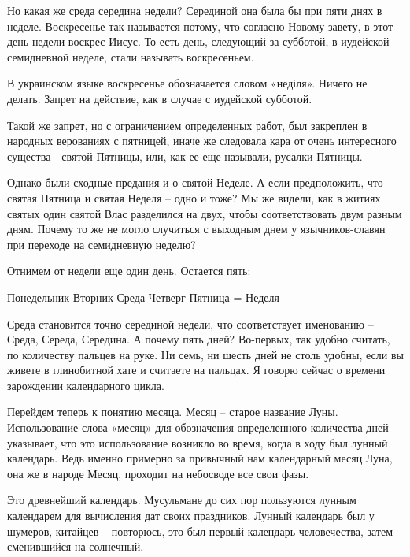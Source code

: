 \documentclass[a5paper,11pt,openany]{article}
\begin{document}
  Но какая же среда середина недели? Серединой она была бы при пяти днях в неделе. Воскресенье так называется потому, что согласно Новому завету, в этот день недели воскрес Иисус. То есть день, следующий за субботой, в иудейской семидневной неделе, стали называть воскресеньем.

  В украинском языке воскресенье обозначается словом «неділя». Ничего не делать. Запрет на действие, как в случае с иудейской субботой.

   Такой же запрет, но с ограничением определенных работ, был закреплен в народных верованиях с пятницей, иначе же следовала кара от очень интересного существа - святой Пятницы, или, как ее еще называли, русалки Пятницы.

 Однако были сходные предания и о святой Неделе. А если предположить, что святая Пятница и святая Неделя – одно и тоже? Мы же видели, как в житиях святых один святой Влас разделился на двух, чтобы соответствовать двум разным дням. Почему то же не могло случиться с выходным днем у язычников-славян при переходе на семидневную неделю?

Отнимем от недели еще один день. Остается пять:\newline 

\noindent Понедельник\newline
Вторник\newline
Среда\newline
Четверг\newline
Пятница = Неделя\newline


Среда становится точно серединой недели, что соответствует именованию – Среда, Середа, Середина. А почему пять дней? Во-первых, так удобно считать, по количеству пальцев на руке. Ни семь, ни шесть дней не столь удобны, если вы живете в глинобитной хате и считаете на пальцах. Я говорю сейчас о времени зарождении календарного цикла.

  Перейдем теперь к понятию месяца. Месяц – старое название Луны. Использование слова «месяц» для обозначения определенного количества дней указывает, что это использование возникло во время, когда в ходу был лунный календарь. Ведь именно примерно за привычный нам календарный месяц Луна, она же в народе Месяц, проходит на небосводе все свои фазы.

   Это древнейший календарь. Мусульмане до сих пор пользуются лунным календарем для вычисления дат своих праздников. Лунный календарь был у шумеров, китайцев – повторюсь, это был первый календарь человечества, затем сменившийся на солнечный.
\end{document}
